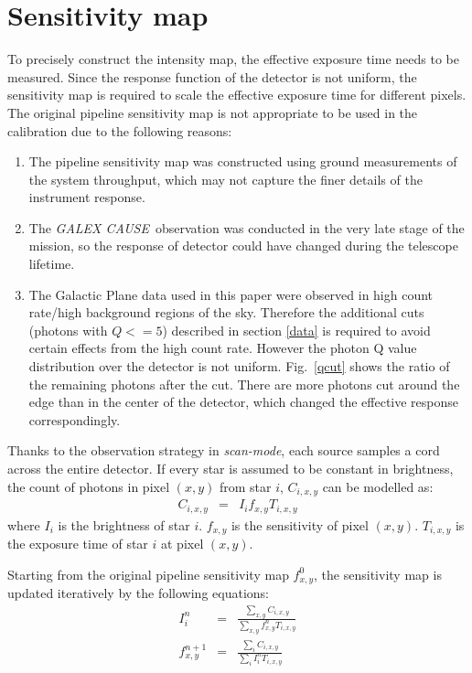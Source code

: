 \documentclass[12pt, preprint]{aastex}
\newcommand{\project}[1]{\textsl{#1}}
\newcommand{\cause}{\project{GALEX CAUSE}}
\newcommand{\scanmode}{\project{scan-mode}}
\begin{document}
\section{Sensitivity map}
\label{sm}
To precisely construct the intensity map, the effective exposure time needs to be measured. 
Since the response function of the detector is not uniform, the sensitivity map is required to scale the effective exposure time for different pixels.
The original pipeline sensitivity map is not appropriate to be used in the calibration due to the following reasons:
\begin{enumerate}
\item The pipeline sensitivity map was constructed using ground measurements of the system throughput, which may not capture the finer details of the instrument response.
\item The \cause\ observation was conducted in the very late stage of the mission, so the response of detector could have changed during the telescope lifetime.
\item The Galactic Plane data used in this paper were observed in high count rate/high background regions of the sky.  
Therefore the additional cuts (photons with $Q<=5$) described in section \ref{data} is required to avoid certain effects from the high count rate. 
However the photon Q value distribution over the detector is not uniform.
Fig.~\ref{qcut} shows the ratio of the remaining photons after the cut.
There are more photons cut around the edge than in the center of the detector, which changed the effective response correspondingly.
\end{enumerate}

Thanks to the observation strategy in \scanmode, each source samples a cord across the entire detector. 
If every star is assumed to be constant in brightness, the count of photons in pixel $(x,y)$ from star $i$, $C_{i,x,y}$ can be modelled as:
\begin{eqnarray}
C_{i,x,y} &=& I_{i}f_{x,y}T_{i,x,y}
\end{eqnarray}
where $I_{i}$ is the brightness of star $i$. 
$f_{x,y}$ is the sensitivity of pixel $(x,y)$.
$T_{i,x,y}$ is the exposure time of star $i$ at pixel $(x,y)$.

Starting from the original pipeline sensitivity map $f_{x,y}^{0}$, the sensitivity map is updated iteratively by the following equations:
\begin{eqnarray}
I_{i}^{n} &=& \frac{\sum_{x,y}C_{i,x,y}}{\sum_{x,y} f_{x,y}^{n} T_{i,x,y}} \\
f_{x,y}^{n+1} &=& \frac{\sum_{i}C_{i,x,y}}{\sum_{i} I_{i}^{n} T_{i,x,y}}
\end{eqnarray}
\end{document}
